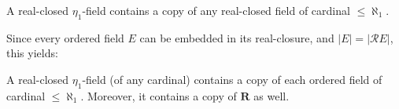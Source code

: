 A real-closed $\eta_1$-field contains a copy of any real-closed field of cardinal $\leq \aleph_1$.

Since every ordered field $E$ can be embedded in its real-closure, and $|E| = |\mathcal{R}E|$, this yields:

A real-closed $\eta_1$-field (of any cardinal) contains a copy of each ordered field of cardinal $\leq \aleph_1$. Moreover, it contains a copy of $\mathbf{R}$ as well.
